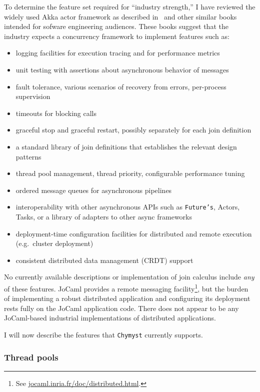 \documentclass[sigplan,10pt]{acmart}\settopmatter{}
\begin{document}
To determine the feature set required for ``industry strength,''
I have reviewed the widely used Akka actor framework as described
in~\citep{AIA2016} and other similar books intended for sofware
engineering audiences. These books suggest that the industry expects
a concurrency framework to implement features such as:
\begin{itemize}
\item logging facilities for execution tracing and for performance metrics 
\item unit testing with assertions about asynchronous behavior of messages 
\item fault tolerance, various scenarios of recovery from errors, per-process
supervision
\item timeouts for blocking calls
\item graceful stop and graceful restart, possibly separately for each join
definition 
\item a standard library of join definitions that establishes the relevant
design patterns
\item thread pool management, thread priority, configurable performance
tuning
\item ordered message queues for asynchronous pipelines
\item interoperability with other asynchronous APIs such as \texttt{Future's},
Actors, Tasks, or a library of adapters to other async frameworks
\item deployment-time configuration facilities for distributed and remote
execution (e.g.~cluster deployment)
\item consistent distributed data management (CRDT) support
\end{itemize}
No currently available descriptions or implementation of join calculus
include \emph{any} of these features. JoCaml provides a remote messaging
facility\footnote{ See \href{http://jocaml.inria.fr/doc/distributed.html}{jocaml.inria.fr/doc/distributed.html}.},
but the burden of implementing a robust distributed application and
configuring its deployment rests fully on the JoCaml application code.
There does not appear to be any JoCaml-based industrial implementations
of distributed applications.

I will now describe the features that \texttt{Chymyst} currently supports.

\subsubsection{Thread pools\label{subsec:Thread-pools}}
\end{document}
